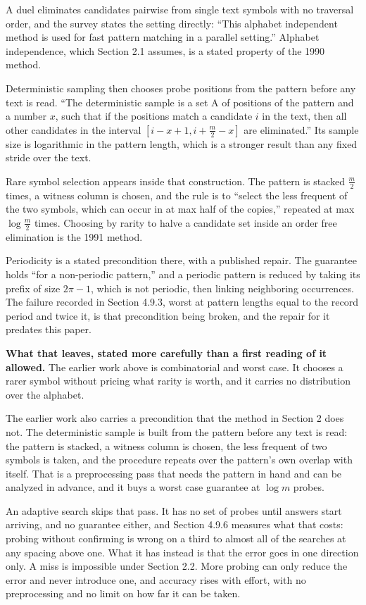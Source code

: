 A duel eliminates candidates pairwise from single text symbols with no traversal order, and the survey states the setting directly: ``This alphabet independent method is used for fast pattern matching in a parallel setting.'' Alphabet independence, which Section 2.1 assumes, is a stated property of the 1990 method.

Deterministic sampling then chooses probe positions from the pattern before any text is read. ``The deterministic sample is a set A of positions of the pattern and a number \(x\), such that if the positions match a candidate \(i\) in the text, then all other candidates in the interval \([i-x+1, i+\tfrac{m}{2}-x]\) are eliminated.'' Its sample size is logarithmic in the pattern length, which is a stronger result than any fixed stride over the text.

Rare symbol selection appears inside that construction. The pattern is stacked \(\tfrac{m}{2}\) times, a witness column is chosen, and the rule is to ``select the less frequent of the two symbols, which can occur in at max half of the copies,'' repeated at max \(\log \tfrac{m}{2}\) times. Choosing by rarity to halve a candidate set inside an order free elimination is the 1991 method.

Periodicity is a stated precondition there, with a published repair. The guarantee holds ``for a non-periodic pattern,'' and a periodic pattern is reduced by taking its prefix of size \(2\pi-1\), which is not periodic, then linking neighboring occurrences. The failure recorded in Section 4.9.3, worst at pattern lengths equal to the record period and twice it, is that precondition being broken, and the repair for it predates this paper.

\noindent\textbf{What that leaves, stated more carefully than a first reading of it allowed.} The earlier work above is combinatorial and worst case. It chooses a rarer symbol without pricing what rarity is worth, and it carries no distribution over the alphabet.

The earlier work also carries a precondition that the method in Section 2 does not. The deterministic sample is built from the pattern before any text is read: the pattern is stacked, a witness column is chosen, the less frequent of two symbols is taken, and the procedure repeats over the pattern's own overlap with itself. That is a preprocessing pass that needs the pattern in hand and can be analyzed in advance, and it buys a worst case guarantee at \(\log m\) probes.

An adaptive search skips that pass. It has no set of probes until answers start arriving, and no guarantee either, and Section 4.9.6 measures what that costs: probing without confirming is wrong on a third to almost all of the searches at any spacing above one. What it has instead is that the error goes in one direction only. A miss is impossible under Section 2.2. More probing can only reduce the error and never introduce one, and accuracy rises with effort, with no preprocessing and no limit on how far it can be taken.

